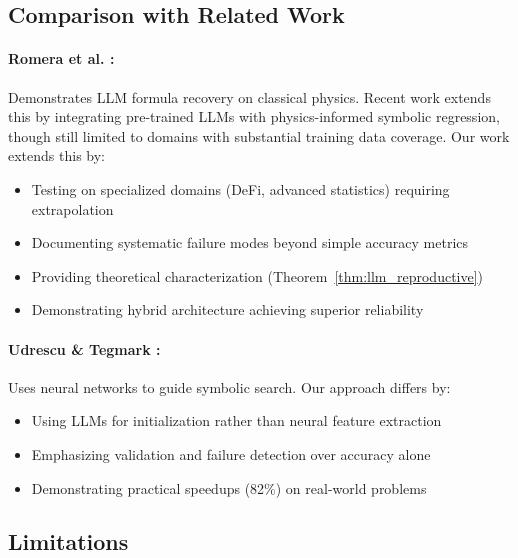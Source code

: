 \documentclass[twoside,11pt]{article}
\begin{document}
\subsection{Comparison with Related Work}

\paragraph{Romera et al. \citep{romera2023discovering}:} Demonstrates LLM formula recovery on classical physics. Recent work \citep{taskin2026knowledge} extends this by integrating pre-trained LLMs with physics-informed symbolic regression, though still limited to domains with substantial training data coverage. Our work extends this by:
\begin{itemize}
\item Testing on specialized domains (DeFi, advanced statistics) requiring extrapolation
\item Documenting systematic failure modes beyond simple accuracy metrics
\item Providing theoretical characterization (Theorem~\ref{thm:llm_reproductive})
\item Demonstrating hybrid architecture achieving superior reliability
\end{itemize}

\paragraph{Udrescu \& Tegmark \citep{udrescu2020ai}:} Uses neural networks to guide symbolic search. Our approach differs by:
\begin{itemize}
\item Using LLMs for initialization rather than neural feature extraction
\item Emphasizing validation and failure detection over accuracy alone
\item Demonstrating practical speedups (82\%) on real-world problems
\end{itemize}

\subsection{Limitations}
\end{document}
